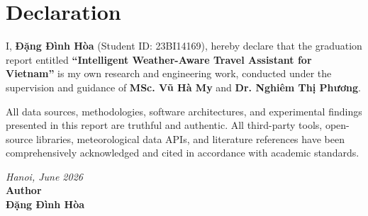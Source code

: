 \chapter*{Declaration}

I, \textbf{Đặng Đình Hòa} (Student ID: 23BI14169), hereby declare that the graduation report entitled \textbf{“Intelligent Weather-Aware Travel Assistant for Vietnam”} is my own research and engineering work, conducted under the supervision and guidance of \textbf{MSc. Vũ Hà My} and \textbf{Dr. Nghiêm Thị Phương}.

All data sources, methodologies, software architectures, and experimental findings presented in this report are truthful and authentic. All third-party tools, open-source libraries, meteorological data APIs, and literature references have been comprehensively acknowledged and cited in accordance with academic standards.

\vspace{15mm}
\begin{flushright}
\textit{Hanoi, June 2026}\\[3mm]
\textbf{Author}\\[15mm]
\textbf{Đặng Đình Hòa}
\end{flushright}
